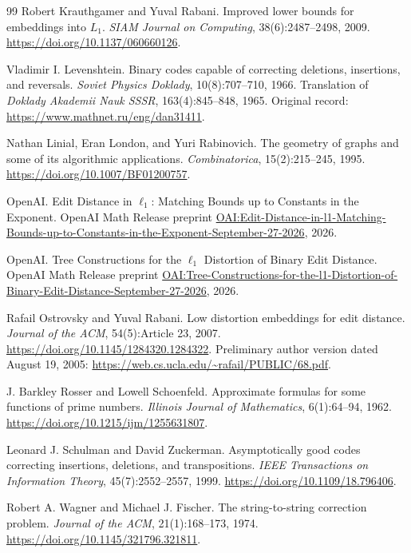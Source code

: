 \begin{thebibliography}{99}
Robert Krauthgamer and Yuval Rabani.
Improved lower bounds for embeddings into $L_1$.
\emph{SIAM Journal on Computing}, 38(6):2487--2498, 2009.
\url{https://doi.org/10.1137/060660126}.

Vladimir I. Levenshtein.
Binary codes capable of correcting deletions, insertions, and reversals.
\emph{Soviet Physics Doklady}, 10(8):707--710, 1966.
Translation of \emph{Doklady Akademii Nauk SSSR}, 163(4):845--848, 1965.
Original record: \url{https://www.mathnet.ru/eng/dan31411}.

Nathan Linial, Eran London, and Yuri Rabinovich.
The geometry of graphs and some of its algorithmic applications.
\emph{Combinatorica}, 15(2):215--245, 1995.
\url{https://doi.org/10.1007/BF01200757}.

OpenAI.
Edit Distance in $\ell_1$: Matching Bounds up to Constants in the Exponent.
OpenAI Math Release preprint
\href{https://github.com/openai/math/blob/main/preprints/Edit-Distance-in-l1-Matching-Bounds-up-to-Constants-in-the-Exponent-September-27-2026/paper.pdf}{OAI:Edit-Distance-in-l1-Matching-Bounds-up-to-Constants-in-the-Exponent-September-27-2026}, 2026.

OpenAI.
Tree Constructions for the $\ell_1$ Distortion of Binary Edit Distance.
OpenAI Math Release preprint
\href{https://github.com/openai/math/blob/main/preprints/Tree-Constructions-for-the-l1-Distortion-of-Binary-Edit-Distance-September-27-2026/paper.pdf}{OAI:Tree-Constructions-for-the-l1-Distortion-of-Binary-Edit-Distance-September-27-2026}, 2026.

Rafail Ostrovsky and Yuval Rabani.
Low distortion embeddings for edit distance.
\emph{Journal of the ACM}, 54(5):Article 23, 2007.
\url{https://doi.org/10.1145/1284320.1284322}.
Preliminary author version dated August 19, 2005:
\url{https://web.cs.ucla.edu/~rafail/PUBLIC/68.pdf}.

J. Barkley Rosser and Lowell Schoenfeld.
Approximate formulas for some functions of prime numbers.
\emph{Illinois Journal of Mathematics}, 6(1):64--94, 1962.
\url{https://doi.org/10.1215/ijm/1255631807}.

Leonard J. Schulman and David Zuckerman.
Asymptotically good codes correcting insertions, deletions, and transpositions.
\emph{IEEE Transactions on Information Theory}, 45(7):2552--2557, 1999.
\url{https://doi.org/10.1109/18.796406}.

Robert A. Wagner and Michael J. Fischer.
The string-to-string correction problem.
\emph{Journal of the ACM}, 21(1):168--173, 1974.
\url{https://doi.org/10.1145/321796.321811}.

\end{thebibliography}

